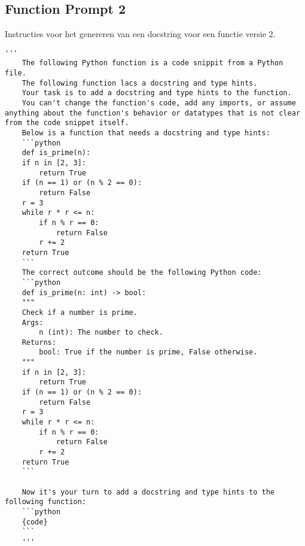 \subsection{Function Prompt 2}
\label{bijlage:prompt2}
Instructies voor het genereren van een docstring voor een functie versie 2.
\begin{verbatim}
'''
    The following Python function is a code snippit from a Python file. 
    The following function lacs a docstring and type hints.
    Your task is to add a docstring and type hints to the function.
    You can't change the function's code, add any imports, or assume anything about the function's behavior or datatypes that is not clear from the code snippet itself.
    Below is a function that needs a docstring and type hints:
    ```python	
    def is_prime(n):
    if n in [2, 3]:
        return True
    if (n == 1) or (n % 2 == 0):
        return False
    r = 3
    while r * r <= n:
        if n % r == 0:
            return False
        r += 2
    return True
    ```
    The correct outcome should be the following Python code:
    ```python	
    def is_prime(n: int) -> bool:
    """
    Check if a number is prime.
    Args:
        n (int): The number to check.
    Returns:
        bool: True if the number is prime, False otherwise.
    """
    if n in [2, 3]:
        return True
    if (n == 1) or (n % 2 == 0):
        return False
    r = 3
    while r * r <= n:
        if n % r == 0:
            return False
        r += 2
    return True
    ```
    
    Now it's your turn to add a docstring and type hints to the following function:
    ```python	
    {code}
    ```
    '''
\end{verbatim}


